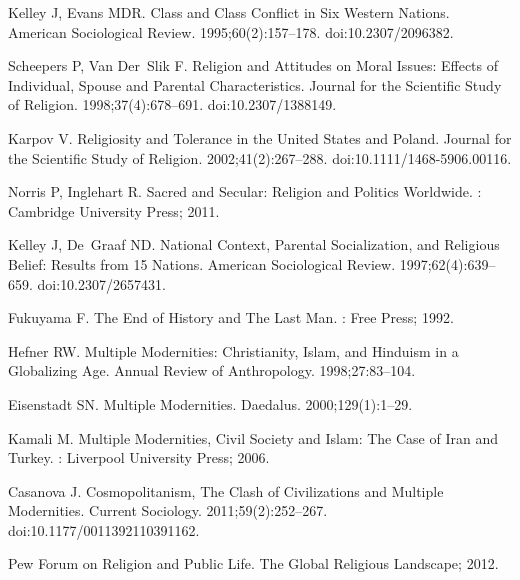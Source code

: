 \documentclass[10pt,letterpaper]{article}
\begin{document}
\begin{thebibliography}{10}
Kelley J, Evans MDR.
\newblock Class and {{Class Conflict}} in {{Six Western Nations}}.
\newblock American Sociological Review. 1995;60(2):157--178.
\newblock doi:{10.2307/2096382}.

Scheepers P, Van Der~Slik F.
\newblock Religion and {{Attitudes}} on {{Moral Issues}}: {{Effects}} of
  {{Individual}}, {{Spouse}} and {{Parental Characteristics}}.
\newblock Journal for the Scientific Study of Religion. 1998;37(4):678--691.
\newblock doi:{10.2307/1388149}.

Karpov V.
\newblock Religiosity and {{Tolerance}} in the {{United States}} and
  {{Poland}}.
\newblock Journal for the Scientific Study of Religion. 2002;41(2):267--288.
\newblock doi:{10.1111/1468-5906.00116}.

Norris P, Inglehart R.
\newblock Sacred and {{Secular}}: {{Religion}} and {{Politics Worldwide}}.
: {Cambridge University Press}; 2011.

Kelley J, De~Graaf ND.
\newblock National {{Context}}, {{Parental Socialization}}, and {{Religious
  Belief}}: {{Results}} from 15 {{Nations}}.
\newblock American Sociological Review. 1997;62(4):639--659.
\newblock doi:{10.2307/2657431}.

Fukuyama F.
\newblock The {{End}} of {{History}} and {{The Last Man}}.
: {Free Press}; 1992.

Hefner RW.
\newblock Multiple {{Modernities}}: {{Christianity}}, {{Islam}}, and
  {{Hinduism}} in a {{Globalizing Age}}.
\newblock Annual Review of Anthropology. 1998;27:83--104.

Eisenstadt SN.
\newblock Multiple {{Modernities}}.
\newblock Daedalus. 2000;129(1):1--29.

Kamali M.
\newblock Multiple {{Modernities}}, {{Civil Society}} and {{Islam}}: The
  {{Case}} of {{Iran}} and {{Turkey}}.
: {Liverpool University Press}; 2006.

Casanova J.
\newblock Cosmopolitanism, {{The Clash}} of {{Civilizations}} and {{Multiple
  Modernities}}.
\newblock Current Sociology. 2011;59(2):252--267.
\newblock doi:{10.1177/0011392110391162}.

{Pew Forum on Religion and Public Life}. The {{Global Religious Landscape}};
  2012.


\end{thebibliography}
\end{document}
